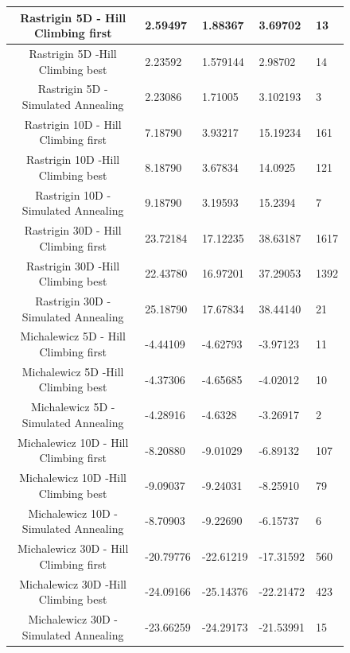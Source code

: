 \documentclass{report}
\begin{document}
\begin{figure}[!h]
\begin{tabular}{||c|||l|l||l||l||}
Rastrigin 5D - Hill Climbing first & 2.59497 & 1.88367 & 3.69702 & 13 \\ \hline
Rastrigin 5D -Hill Climbing  best & 2.23592 & 1.579144 & 2.98702 & 14 \\ \hline
Rastrigin 5D - Simulated Annealing & 2.23086 & 1.71005 & 3.102193 & 3 \\ \hline

Rastrigin 10D - Hill Climbing first & 7.18790 & 3.93217 & 15.19234 & 161 \\ \hline
Rastrigin 10D -Hill Climbing  best& 8.18790 & 3.67834 & 14.0925 & 121 \\ \hline
Rastrigin 10D - Simulated Annealing & 9.18790 & 3.19593 & 15.2394 & 7 \\ \hline

Rastrigin  30D - Hill Climbing first & 23.72184 & 17.12235 & 38.63187 & 1617 \\ \hline
Rastrigin  30D -Hill Climbing  best & 22.43780 & 16.97201 & 37.29053 & 1392 \\ \hline
Rastrigin  30D - Simulated Annealing & 25.18790 & 17.67834 & 38.44140 & 21 \\ \hline

Michalewicz 5D - Hill Climbing first & -4.44109 & -4.62793 & -3.97123 & 11 \\ \hline
Michalewicz 5D -Hill Climbing  best & -4.37306 &  -4.65685 & -4.02012 & 10 \\ \hline
Michalewicz 5D - Simulated Annealing & -4.28916 & -4.6328 & -3.26917 & 2 \\ \hline

Michalewicz 10D - Hill Climbing first & -8.20880 & -9.01029 & -6.89132 & 107 \\ \hline
Michalewicz 10D -Hill Climbing  best & -9.09037 &  -9.24031 & -8.25910 & 79 \\ \hline
Michalewicz 10D - Simulated Annealing & -8.70903 & -9.22690 &  -6.15737 & 6 \\ \hline

Michalewicz 30D - Hill Climbing first & -20.79776 & -22.61219 & -17.31592 & 560 \\ \hline
Michalewicz 30D -Hill Climbing  best & -24.09166 & -25.14376 & -22.21472 & 423 \\ \hline
Michalewicz 30D - Simulated Annealing & -23.66259 & -24.29173 & -21.53991 & 15 \\ \hline

  
\end{tabular}
\end{figure}
\end{document}
